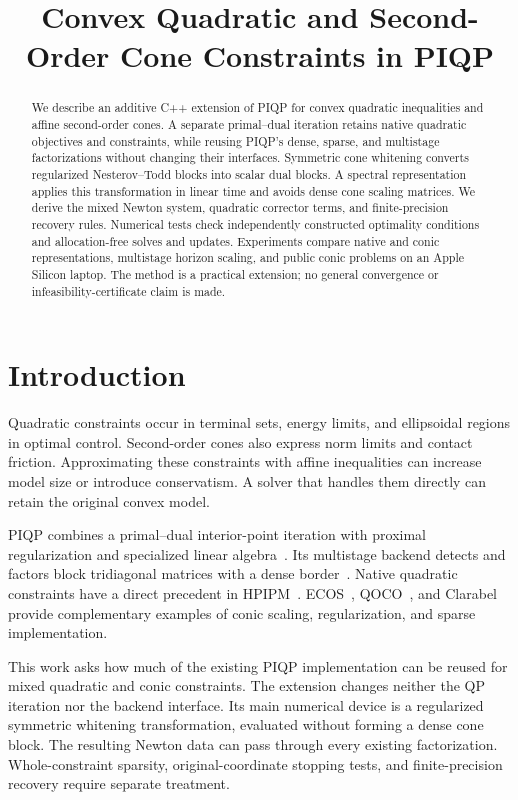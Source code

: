 \documentclass[conference]{IEEEtran}
\title{Convex Quadratic and Second-Order Cone Constraints in PIQP}
\author{\IEEEauthorblockN{Working draft}}
\begin{document}
\maketitle
\begin{abstract}
We describe an additive C++ extension of PIQP for convex quadratic inequalities and affine second-order cones. A separate primal--dual iteration retains native quadratic objectives and constraints, while reusing PIQP's dense, sparse, and multistage factorizations without changing their interfaces. Symmetric cone whitening converts regularized Nesterov--Todd blocks into scalar dual blocks. A spectral representation applies this transformation in linear time and avoids dense cone scaling matrices. We derive the mixed Newton system, quadratic corrector terms, and finite-precision recovery rules. Numerical tests check independently constructed optimality conditions and allocation-free solves and updates. Experiments compare native and conic representations, multistage horizon scaling, and public conic problems on an Apple Silicon laptop. The method is a practical extension; no general convergence or infeasibility-certificate claim is made.
\end{abstract}

\section{Introduction}
Quadratic constraints occur in terminal sets, energy limits, and ellipsoidal regions in optimal control. Second-order cones also express norm limits and contact friction. Approximating these constraints with affine inequalities can increase model size or introduce conservatism. A solver that handles them directly can retain the original convex model.

PIQP combines a primal--dual interior-point iteration with proximal regularization and specialized linear algebra~\cite{piqp}. Its multistage backend detects and factors block tridiagonal matrices with a dense border~\cite{multistage}. Native quadratic constraints have a direct precedent in HPIPM~\cite{hpipm}. ECOS~\cite{ecos}, QOCO~\cite{qoco}, and Clarabel~\cite{clarabel} provide complementary examples of conic scaling, regularization, and sparse implementation.

This work asks how much of the existing PIQP implementation can be reused for mixed quadratic and conic constraints. The extension changes neither the QP iteration nor the backend interface. Its main numerical device is a regularized symmetric whitening transformation, evaluated without forming a dense cone block. The resulting Newton data can pass through every existing factorization. Whole-constraint sparsity, original-coordinate stopping tests, and finite-precision recovery require separate treatment.
\end{document}
